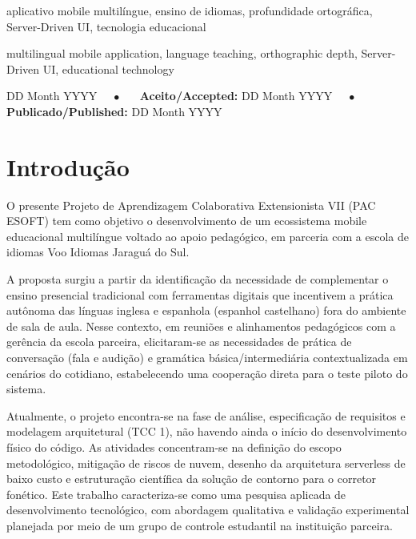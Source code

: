 \documentclass[portuguese]{sbcreviews-2025}%
\begin{document}
\begin{frontmatter}
\begin{pchaves}
aplicativo mobile multilíngue, ensino de idiomas, profundidade ortográfica, Server-Driven UI, tecnologia educacional
\end{pchaves}

\begin{keywords}
multilingual mobile application, language teaching, orthographic depth, Server-Driven UI, educational technology
\end{keywords}

\begin{dates}
 DD Month YYYY~~~$\bullet$~~~
{\sffamily\textbf{Aceito/Accepted:}} DD Month YYYY~~~$\bullet$~~~
{\sffamily\textbf{Publicado/Published:}} DD Month YYYY
\end{dates}

\end{frontmatter}

\section{Introdução}
\label{sec:intro}

O presente Projeto de Aprendizagem Colaborativa Extensionista VII (PAC ESOFT) tem como objetivo o desenvolvimento de um ecossistema mobile educacional multilíngue voltado ao apoio pedagógico, em parceria com a escola de idiomas Voo Idiomas Jaraguá do Sul.

A proposta surgiu a partir da identificação da necessidade de complementar o ensino presencial tradicional com ferramentas digitais que incentivem a prática autônoma das línguas inglesa e espanhola (espanhol castelhano) fora do ambiente de sala de aula. Nesse contexto, em reuniões e alinhamentos pedagógicos com a gerência da escola parceira, elicitaram-se as necessidades de prática de conversação (fala e audição) e gramática básica/intermediária contextualizada em cenários do cotidiano, estabelecendo uma cooperação direta para o teste piloto do sistema.

Atualmente, o projeto encontra-se na fase de análise, especificação de requisitos e modelagem arquitetural (TCC 1), não havendo ainda o início do desenvolvimento físico do código. As atividades concentram-se na definição do escopo metodológico, mitigação de riscos de nuvem, desenho da arquitetura serverless de baixo custo e estruturação científica da solução de contorno para o corretor fonético. Este trabalho caracteriza-se como uma pesquisa aplicada de desenvolvimento tecnológico, com abordagem qualitativa e validação experimental planejada por meio de um grupo de controle estudantil na instituição parceira.
\end{document}
